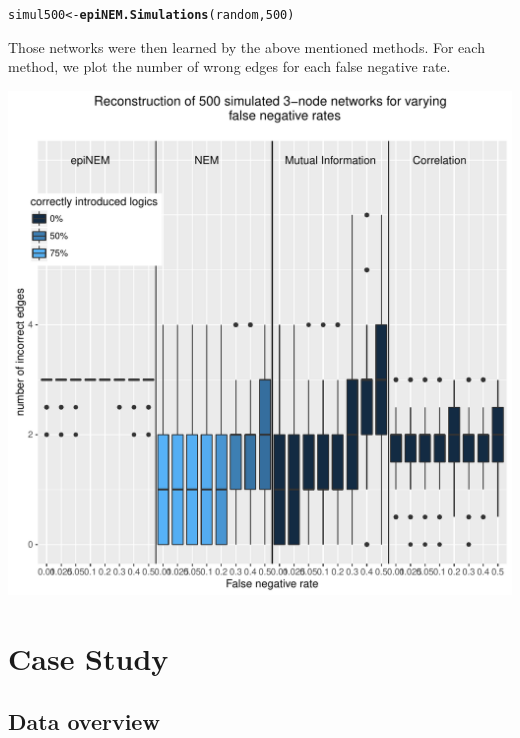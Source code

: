 \documentclass[paper=a4,notitlepage,DIV=12]{scrartcl}\usepackage[]{graphicx}\usepackage[]{color}
\makeatletter
\def\maxwidth{ %
  \ifdim\Gin@nat@width>\linewidth
    \linewidth
  \else
    \Gin@nat@width
  \fi
}
\newcommand{\hlnum}[1]{\textcolor[rgb]{0.686,0.059,0.569}{#1}}%
\newcommand{\hlstd}[1]{\textcolor[rgb]{0.345,0.345,0.345}{#1}}%
\newcommand{\hlkwb}[1]{\textcolor[rgb]{0.69,0.353,0.396}{#1}}%
\newcommand{\hlkwd}[1]{\textcolor[rgb]{0.737,0.353,0.396}{\textbf{#1}}}%
\newenvironment{kframe}{%
 \def\at@end@of@kframe{}%
 \ifinner\ifhmode%
  \def\at@end@of@kframe{\end{minipage}}%
  \begin{minipage}{\columnwidth}%
 \fi\fi%
 \def\FrameCommand##1{\hskip\@totalleftmargin \hskip-\fboxsep
 \colorbox{shadecolor}{##1}\hskip-\fboxsep
     \hskip-\linewidth \hskip-\@totalleftmargin \hskip\columnwidth}%
 \MakeFramed {\advance\hsize-\width
   \@totalleftmargin\z@ \linewidth\hsize
   \@setminipage}}%
 {\par\unskip\endMakeFramed%
 \at@end@of@kframe}
\newenvironment{knitrout}{}{} %
\makeatother
\begin{document}
\begin{knitrout}
\color{fgcolor}\begin{kframe}
\begin{alltt}
\hlstd{simul500} \hlkwb{<-} \hlkwd{epiNEM.Simulations}\hlstd{(random,} \hlnum{500}\hlstd{)}
\end{alltt}
\end{kframe}
\end{knitrout}

Those networks were then learned by the above mentioned methods. For each method, we plot the number of wrong edges for each false negative rate.

\begin{knitrout}
\color{fgcolor}
\includegraphics[width=\maxwidth]{figure/unnamed-chunk-4-1} 

\end{knitrout}



\section{Case Study}

\subsection{Data overview}
\end{document}
